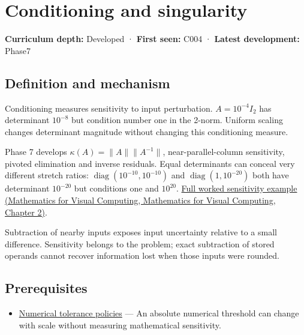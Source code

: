 \hypertarget{appendix-8f6a01f284a7}{}\label{referencestart:appendix-8f6a01f284a7}
\section{Conditioning and singularity}\label{appendix-8f6a01f284a7-conditioning-and-singularity}

\textbf{Curriculum depth:} Developed · \textbf{First seen:} C004 · \textbf{Latest development:} Phase7

\subsection{Definition and mechanism}\label{appendix-8f6a01f284a7-definition-and-mechanism}

Conditioning measures sensitivity to input perturbation. \(A=10^{-4}I_2\) has determinant \(10^{-8}\) but condition number one in the 2-norm. Uniform scaling changes determinant magnitude without changing this conditioning measure.

Phase 7 develops \(\kappa(A)=\|A\|\|A^{-1}\|\), near-parallel-column sensitivity, pivoted elimination and inverse residuals. Equal determinants can conceal very different stretch ratios: \(\operatorname{diag}(10^{-10},10^{-10})\) and \(\operatorname{diag}(1,10^{-20})\) both have determinant \(10^{-20}\) but conditions one and \(10^{20}\). \href{../02-Mathematics-for-Visual-Computing/main.pdf\#nameddest=01-foundations-i-ch018-an-inverse-can-exist-and-still-amplify-uncertainty}{Full worked sensitivity example (Mathematics for Visual Computing, Mathematics for Visual Computing, Chapter 2)}.

Subtraction of nearby inputs exposes input uncertainty relative to a small difference. Sensitivity belongs to the problem; exact subtraction of stored operands cannot recover information lost when those inputs were rounded.

\subsection{Prerequisites}\label{appendix-8f6a01f284a7-prerequisites}

\begin{itemize}
\tightlist
\item
  \hyperref[appendix-0ec599f8ba27]{Numerical tolerance policies} --- An absolute numerical threshold can change with scale without measuring mathematical sensitivity.
\end{itemize}

